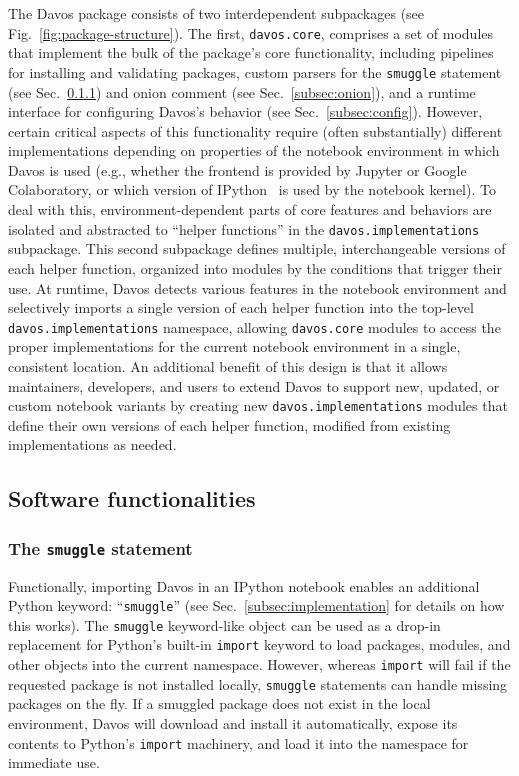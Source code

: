 \documentclass[preprint,12pt,a4paper]{elsarticle}
\begin{document}
The Davos package consists of two interdependent subpackages
(see Fig.~\ref{fig:package-structure}). The first,
\texttt{davos.core}, comprises a set of modules that
implement the bulk of the package's core
functionality, including pipelines for installing and validating
packages, custom parsers for the \texttt{smuggle} statement (see
Sec.~\ref{subsec:smuggle}) and onion comment (see
Sec.~\ref{subsec:onion}), and a runtime interface for configuring
Davos's behavior (see Sec.~\ref{subsec:config}). However,
certain critical aspects of this
functionality require (often substantially) different implementations
depending on properties of the notebook environment in which
Davos is used (e.g., whether the frontend is provided by
Jupyter or Google Colaboratory, or which version of
IPython~\cite{PereGran07} is used by the notebook kernel). To deal
with this, environment-dependent parts of core features and behaviors
are isolated and abstracted to ``helper functions'' in the
\texttt{davos.implementations} subpackage. This second subpackage
defines multiple, interchangeable versions of each helper function,
organized into modules by the conditions that trigger their use. At
runtime, Davos detects various features in the notebook
environment and selectively imports a single version of each helper
function into the top-level \texttt{davos.implementations} namespace,
allowing \texttt{davos.core} modules to access the proper
implementations for the current notebook environment in a single,
consistent location. An additional benefit of this design is that it
allows maintainers, developers, and users to extend Davos to
support new, updated, or custom notebook variants by creating new
\texttt{davos.implementations} modules that define their own versions
of each helper function, modified from existing implementations as
needed.

\subsection{Software functionalities}

\subsubsection{The \texttt{smuggle} statement}\label{subsec:smuggle}

Functionally, importing Davos in an IPython notebook enables
an additional Python keyword: ``\texttt{smuggle}'' (see
Sec.~\ref{subsec:implementation} for details on how this works).
The \texttt{smuggle} keyword-like object can be used as a drop-in
replacement for Python's built-in \texttt{import} keyword to load
packages, modules, and other objects into the current namespace.
However, whereas \texttt{import} will fail if the requested package is
not installed locally, \texttt{smuggle} statements can handle missing
packages on the fly.  If a smuggled package does not exist in the
local environment, Davos will download and install it automatically,
expose its contents to Python's \texttt{import} machinery, and load it
into the namespace for immediate use.
\end{document}
